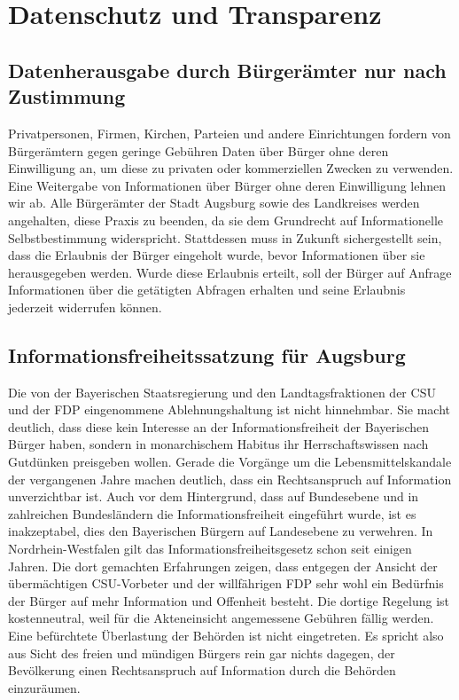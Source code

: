\chapter{Datenschutz und Transparenz}

  \section{Datenherausgabe durch Bürgerämter nur nach Zustimmung}
  
  Privatpersonen, Firmen, Kirchen, Parteien und andere Einrichtungen fordern 
  von Bürgerämtern gegen geringe Gebühren Daten über Bürger ohne deren 
  Einwilligung an, um diese zu privaten oder kommerziellen Zwecken zu 
  verwenden. Eine Weitergabe von Informationen über Bürger ohne deren 
  Einwilligung lehnen wir ab. Alle Bürgerämter der Stadt Augsburg sowie des 
  Landkreises werden angehalten, diese Praxis zu beenden, da sie dem 
  Grundrecht auf Informationelle Selbstbestimmung widerspricht. Stattdessen 
  muss in Zukunft sichergestellt sein, dass die Erlaubnis der Bürger eingeholt 
  wurde, bevor Informationen über sie herausgegeben werden. Wurde diese 
  Erlaubnis erteilt, soll der Bürger auf Anfrage Informationen über die 
  getätigten Abfragen erhalten und seine Erlaubnis jederzeit widerrufen 
  können. 
  
  \section{Informationsfreiheitssatzung für Augsburg}
  
  Die von der Bayerischen Staatsregierung und den Landtagsfraktionen der CSU 
  und der FDP eingenommene Ablehnungshaltung ist nicht hinnehmbar. Sie macht 
  deutlich, dass diese kein Interesse an der Informationsfreiheit der 
  Bayerischen Bürger haben, sondern in monarchischem Habitus ihr 
  Herrschaftswissen nach Gutdünken preisgeben wollen. Gerade die Vorgänge um 
  die Lebensmittelskandale der vergangenen Jahre machen deutlich, dass ein 
  Rechtsanspruch auf Information unverzichtbar ist. Auch vor dem Hintergrund, 
  dass auf Bundesebene und in zahlreichen Bundesländern die 
  Informationsfreiheit eingeführt wurde, ist es inakzeptabel, dies den 
  Bayerischen Bürgern auf Landesebene zu verwehren. In Nordrhein-Westfalen 
  gilt das Informationsfreiheitsgesetz schon seit einigen Jahren. Die dort 
  gemachten Erfahrungen zeigen, dass entgegen der Ansicht der übermächtigen 
  CSU-Vorbeter und der willfährigen FDP sehr wohl ein Bedürfnis der Bürger auf 
  mehr Information und Offenheit besteht. Die dortige Regelung ist 
  kostenneutral, weil für die Akteneinsicht angemessene Gebühren fällig 
  werden. Eine befürchtete Überlastung der Behörden ist nicht eingetreten. Es 
  spricht also aus Sicht des freien und mündigen Bürgers rein gar nichts 
  dagegen, der Bevölkerung einen Rechtsanspruch auf Information durch die 
  Behörden einzuräumen.
  
